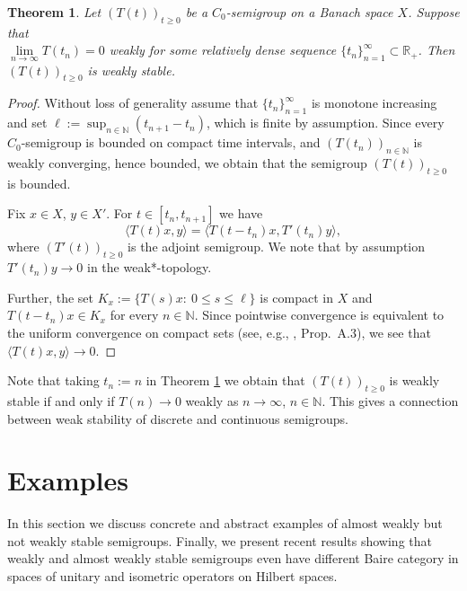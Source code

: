 \documentclass[11pt,intlimits, draft,oneside]{amsart}
\newtheorem{thm}{Theorem}[section]
\theoremstyle{definition}
\def\RR{\mathbb{R}}
\def\NN{\mathbb{N}}
\begin{document}
\begin{thm} \label{thm:equidistant}
Let $(T(t))_{t \geq 0}$ be a $C_0$-semigroup on a Banach space $X$.
Suppose that \\ $\lim\limits_{n\to\infty} T(t_n)= 0$ weakly for some
relatively dense sequence $\{t_n\}_{n=1}^\infty \subset \RR_+$. Then
$(T(t))_{t \geq 0}$ is weakly stable.
\end{thm}
\begin{proof}Without loss of generality assume that $\{t_n\}_{n=1}^\infty$ is
monotone increasing and set $\ell:=\sup_{n\in \NN}(t_{n+1}-t_n)$,
which is finite by assumption. Since every $C_0$-semigroup is
bounded on compact time intervals, and $(T(t_n))_{n\in\NN}$ is
weakly converging, hence bounded, we obtain that the semigroup
$(T(t))_{t\geq 0}$ is bounded.

Fix $x\in X$, $y\in X'$. For $t\in [t_{n}, t_{n+1}]$ we have
%
\begin{equation*}
\langle T(t)x,y \rangle = \langle T(t-t_n)x,T'(t_n)y \rangle,
\end{equation*}
where $(T'(t))_{t\geq 0}$ is the adjoint semigroup. We note that by
assumption $T'(t_n)y\to 0$ in the weak*-topology.

Further, the set $K_x:=\{T(s)x:\ 0\leq s\leq \ell\}$ is compact in
$X$ and $T(t-t_n)x\in K_x$ for every $n\in\NN$. Since pointwise
convergence is equivalent to the uniform convergence on compact sets
(see, e.g., \cite{engel/nagel:2000}, Prop.~A.3), we see that
$\langle T(t)x,y \rangle \to 0$.
\end{proof}

Note that taking $t_n:=n$ in Theorem \ref{thm:equidistant} we obtain
that $(T(t))_{t\geq 0}$ is weakly stable if and only if $T(n)\to 0$
weakly as $n\to\infty$, $n\in\NN$. This gives a connection between
weak stability of discrete and continuous semigroups.



\section{Examples} \label{section:examples}

In this section we discuss concrete and abstract examples of almost
weakly but not weakly stable\- semigroups. Finally, we present recent
results showing that weakly and almost weakly stable semigroups even
have different Baire category in spaces of unitary and isometric
operators on Hilbert spaces.
\end{document}
